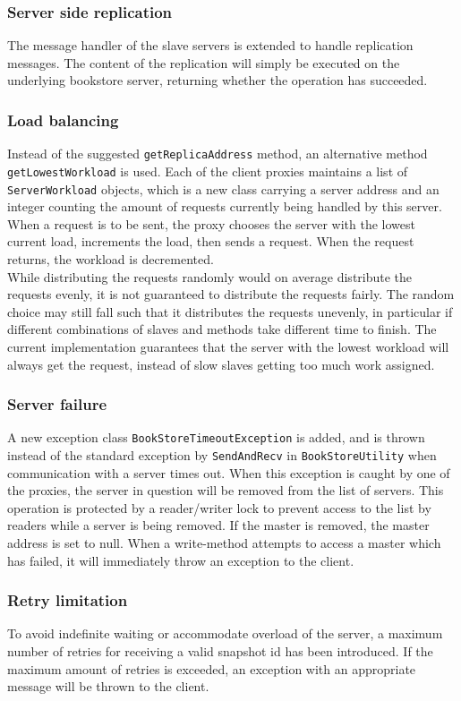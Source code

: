 \documentclass[12pt]{article}
\begin{document}
\subsubsection*{Server side replication}
The message handler of the slave servers is extended to handle replication messages. The content of the replication will simply be executed on the underlying bookstore server, returning whether the operation has succeeded.
\subsubsection*{Load balancing}
Instead of the suggested \verb|getReplicaAddress| method, an alternative method \verb|getLowestWorkload| is used. Each of the client proxies maintains a list of \verb|ServerWorkload| objects, which is a new class carrying a server address and an integer counting the amount of requests currently being handled by this server. When a request is to be sent, the proxy chooses the server with the lowest current load, increments the load, then sends a request. When the request returns, the workload is decremented. \\
While distributing the requests randomly would on average distribute the requests evenly, it is not guaranteed to distribute the requests fairly. The random choice may still fall such that it distributes the requests unevenly, in particular if different combinations of slaves and methods take different time to finish. The current implementation guarantees that the server with the lowest workload will always get the request, instead of slow slaves getting too much work assigned.
\subsubsection*{Server failure}
A new exception class \verb|BookStoreTimeoutException| is added, and is thrown instead of the standard exception by \verb|SendAndRecv| in \verb|BookStoreUtility| when communication with a server times out. When this exception is caught by one of the proxies, the server in question will be removed from the list of servers. This operation is protected by a reader/writer lock to prevent access to the list by readers while a server is being removed. If the master is removed, the master address is set to null. When a write-method attempts to access a master which has failed, it will immediately throw an exception to the client.
\subsubsection*{Retry limitation}
To avoid indefinite waiting or accommodate overload of the server, a maximum number of retries for receiving a valid snapshot id has been introduced. If the maximum amount of retries is exceeded, an exception with an appropriate message will be thrown to the client.
\end{document}
